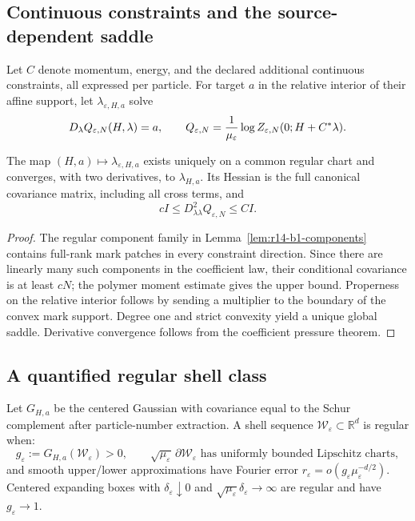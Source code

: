 \subsection{Continuous constraints and the source-dependent saddle}

Let \(C\) denote momentum, energy, and the declared additional continuous
constraints, all expressed per particle.  For target \(a\) in the relative
interior of their affine support, let \(\lambda_{\varepsilon,H,a}\) solve
\[
 D_\lambda Q_{\varepsilon,N}(H,\lambda)=a,
 \qquad
 Q_{\varepsilon,N}
 ={1\over\mu_\varepsilon}\log
 Z_{\varepsilon,N}(0;H+C^*\lambda).
\]

\begin{theorem}
\label{thm:r14-b1-continuous}
The map \((H,a)\mapsto\lambda_{\varepsilon,H,a}\) exists uniquely on a common
regular chart and converges, with two derivatives, to
\(\lambda_{H,a}\).  Its Hessian is the full canonical covariance matrix,
including all cross terms, and
\[
 cI\le D_{\lambda\lambda}^2Q_{\varepsilon,N}\le CI .
\]
\end{theorem}

\begin{proof}
The regular component family in
Lemma~\ref{lem:r14-b1-components} contains full-rank mark patches in every
constraint direction.  Since there are linearly many such components in the
coefficient law, their conditional covariance is at least \(cN\); the
polymer moment estimate gives the upper bound.  Properness on the relative
interior follows by sending a multiplier to the boundary of the convex mark
support.  Degree one and strict convexity yield a unique global saddle.
Derivative convergence follows from the coefficient pressure theorem.
\end{proof}

\subsection{A quantified regular shell class}

Let \(G_{H,a}\) be the centered Gaussian with covariance equal to the Schur
complement after particle-number extraction.  A shell sequence
\(\mathcal W_\varepsilon\subset\mathbb R^d\) is regular when:
\[
 g_\varepsilon:=G_{H,a}(\mathcal W_\varepsilon)>0,\qquad
 \sqrt{\mu_\varepsilon}\,\partial\mathcal W_\varepsilon
 \text{ has uniformly bounded Lipschitz charts},
\]
and smooth upper/lower approximations have Fourier error
\(r_\varepsilon=o(g_\varepsilon\mu_\varepsilon^{-d/2})\).
Centered expanding boxes with
\(\delta_\varepsilon\downarrow0\) and
\(\sqrt{\mu_\varepsilon}\delta_\varepsilon\to\infty\) are regular and have
\(g_\varepsilon\to1\).

